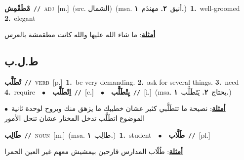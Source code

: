 \documentclass[10pt,a4paper,twoside]{article} %
\begin{document}
\begin{multicols}{2}
{\setlength\topsep{0pt}\textbf{\foreignlanguage{arabic}{مْطَقْمِش}}\ {\color{gray}\texttt{//}\color{black}}\ \textsc{adj}\ [m.]\ (src. \color{gray}\foreignlanguage{arabic}{الشمال}\color{black})\ \color{gray}(msa. \foreignlanguage{arabic}{أنيق}~\foreignlanguage{arabic}{\textbf{٢.}}  \foreignlanguage{arabic}{مهندَم}~\foreignlanguage{arabic}{\textbf{١.}})\color{black}\ \textbf{1.}~well-groomed  \textbf{2.}~elegant\  \begin{flushright}\color{gray}\foreignlanguage{arabic}{\textbf{\underline{\foreignlanguage{arabic}{أمثلة}}}: ما شاء الله عليها والله كانت مطقمشة بالعرس}\end{flushright}\color{black}} \vspace{2mm}

\vspace{-3mm}
\subsection*{\color{blue}\foreignlanguage{arabic}{ط.ل.ب}\color{blue}{}} 

{\setlength\topsep{0pt}\textbf{\foreignlanguage{arabic}{تْطَلَّب}}\ {\color{gray}\texttt{//}\color{black}}\ \textsc{verb}\ [p.]\ \textbf{1.}~be very demanding.  \textbf{2.}~ask for several things.  \textbf{3.}~need  \textbf{4.}~require\ \ $\bullet$\ \ \setlength\topsep{0pt}\textbf{\foreignlanguage{arabic}{اِتْطَلَّب}}\ {\color{gray}\texttt{//}\color{black}}\ [c.]\ \ $\bullet$\ \ \setlength\topsep{0pt}\textbf{\foreignlanguage{arabic}{يِتْطَلَّب}}\ {\color{gray}\texttt{//}\color{black}}\ [i.]\ \color{gray}(msa. \foreignlanguage{arabic}{يحتاج}~\foreignlanguage{arabic}{\textbf{٢.}}  \foreignlanguage{arabic}{يَتَطَلَّب}~\foreignlanguage{arabic}{\textbf{١.}})\color{black}\  \begin{flushright}\color{gray}\foreignlanguage{arabic}{\textbf{\underline{\foreignlanguage{arabic}{أمثلة}}}: نصيحة ما تتطَلَّبي كثير عشان خطيبك ما يزهق منك ويروح لوحدة ثانية\ $\bullet$\ \  الموضوع اتطَلَّب تدخل المختار عشان تنحل الأمور}\end{flushright}\color{black}} \vspace{2mm}

{\setlength\topsep{0pt}\textbf{\foreignlanguage{arabic}{طَالِب}}\ {\color{gray}\texttt{//}\color{black}}\ \textsc{noun}\ [m.]\ \color{gray}(msa. \foreignlanguage{arabic}{طالِب}~\foreignlanguage{arabic}{\textbf{١.}})\color{black}\ \textbf{1.}~student\ \ $\bullet$\ \ \setlength\topsep{0pt}\textbf{\foreignlanguage{arabic}{طُلَّاب}}\ {\color{gray}\texttt{//}\color{black}}\ [pl.]\  \begin{flushright}\color{gray}\foreignlanguage{arabic}{\textbf{\underline{\foreignlanguage{arabic}{أمثلة}}}: طُلّاب المدارس قارحين بيمشيش معهم غير العين الحمرا}\end{flushright}\color{black}} \vspace{2mm}


\end{multicols}
\end{document}
